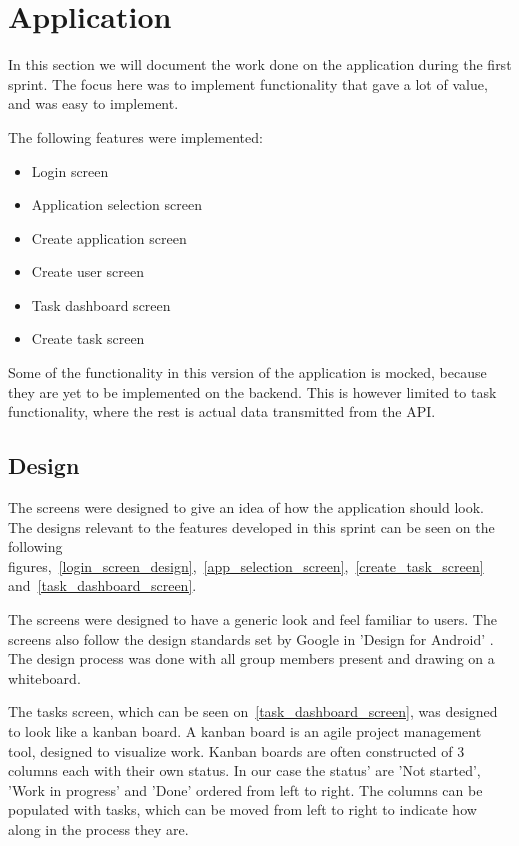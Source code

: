 \section{Application}
In this section we will document the work done on the application during the first sprint.
The focus here was to implement functionality that gave a lot of value, and was easy to implement.

The following features were implemented:
\begin{itemize}
    \item Login screen
    \item Application selection screen
    \item Create application screen
    \item Create user screen
    \item Task dashboard screen
    \item Create task screen
\end{itemize}

Some of the functionality in this version of the application is mocked, because they are yet to be implemented on the backend.
This is however limited to task functionality, where the rest is actual data transmitted from the API.

\subsection{Design}
\label{sprint_1_design}
The screens were designed to give an idea of how the application should look.
The designs relevant to the features developed in this sprint can be seen on the following figures,~\autoref{login_screen_design},~\autoref{app_selection_screen},~\autoref{create_task_screen} and~\autoref{task_dashboard_screen}.

The screens were designed to have a generic look and feel familiar to users.
The screens also follow the design standards set by Google in 'Design for Android' \cite{AndroidDesign}.
The design process was done with all group members present and drawing on a whiteboard.



The tasks screen, which can be seen on~\autoref{task_dashboard_screen}, was designed to look like a kanban board.
A kanban board is an agile project management tool, designed to visualize work.
Kanban boards are often constructed of 3 columns each with their own status. In our case the status' are 'Not started', 'Work in progress' and 'Done' ordered from left to right.
The columns can be populated with tasks, which can be moved from left to right to indicate how along in the process they are.

